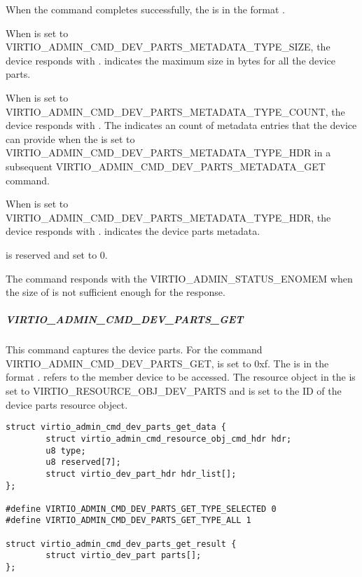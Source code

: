 When the command completes successfully, the
 is in the format
.

When  is set to VIRTIO_ADMIN_CMD_DEV_PARTS_METADATA_TYPE_SIZE,
the device responds with .  indicates
the maximum size in bytes for all the device parts.

When  is set to VIRTIO_ADMIN_CMD_DEV_PARTS_METADATA_TYPE_COUNT, the
device responds with . The
 indicates an count of
 metadata entries that the device can
provide when the  is set to VIRTIO_ADMIN_CMD_DEV_PARTS_METADATA_TYPE_HDR
in a subsequent VIRTIO_ADMIN_CMD_DEV_PARTS_METADATA_GET command.

When  is set to VIRTIO_ADMIN_CMD_DEV_PARTS_METADATA_TYPE_HDR,
the device responds with . 
indicates the device parts metadata.

 is reserved and set to 0.

The command responds with the  VIRTIO_ADMIN_STATUS_ENOMEM
when the size of  is not sufficient enough
for the response.

\subparagraph{VIRTIO_ADMIN_CMD_DEV_PARTS_GET}
\label{par:Basic Facilities of a Virtio Device / Device groups / Group administration commands / Device parts /  Device parts handling commands / VIRTIO_ADMIN_CMD_DEV_PARTS_GET}

This command captures the device parts. For the command
VIRTIO_ADMIN_CMD_DEV_PARTS_GET,  is set to 0xf.
The  is in the format
.
 refers to the member device to be accessed.
The resource object  in the  is set to
VIRTIO_RESOURCE_OBJ_DEV_PARTS and  is set to the ID of the
device parts resource object.

\begin{lstlisting}
struct virtio_admin_cmd_dev_parts_get_data {
        struct virtio_admin_cmd_resource_obj_cmd_hdr hdr;
        u8 type;
        u8 reserved[7];
        struct virtio_dev_part_hdr hdr_list[];
};

#define VIRTIO_ADMIN_CMD_DEV_PARTS_GET_TYPE_SELECTED 0
#define VIRTIO_ADMIN_CMD_DEV_PARTS_GET_TYPE_ALL 1

struct virtio_admin_cmd_dev_parts_get_result {
        struct virtio_dev_part parts[];
};

\end{lstlisting}

